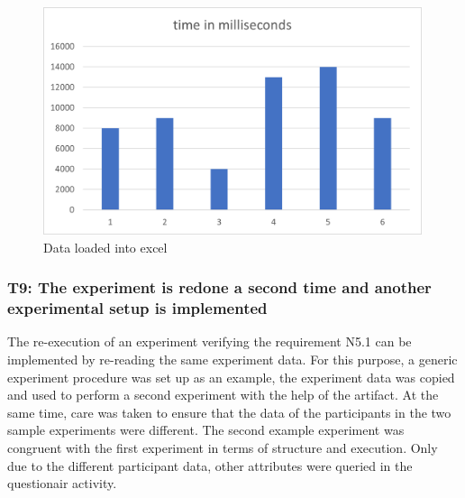 \begin{figure}[htbp]
    \centering
    \includegraphics[width=0.99\textwidth, keepaspectratio]{content/07_evaluation_of_the_solution/ExcelPicture.png}
    \caption{Data loaded into excel}    
    \label{fig:Excel}
\end{figure}


\newpage\subsubsection*{T9: The experiment is redone a second time and another experimental setup is implemented}

The re-execution of an experiment verifying the requirement N5.1 can be implemented by re-reading the same experiment data. For this purpose, a generic experiment procedure was set up as an example, the experiment data was copied and used to perform a second experiment with the help of the artifact. At the same time, care was taken to ensure that the data of the participants in the two sample experiments were different. The second example experiment was congruent with the first experiment in terms of structure and execution. Only due to the different participant data, other attributes were queried in the questionair activity.




